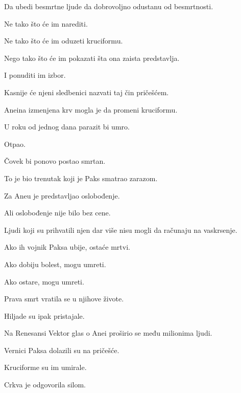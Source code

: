 Da ubedi besmrtne ljude da dobrovoljno odustanu od besmrtnosti.

\bigskip

Ne tako što će im narediti.

Ne tako što će im oduzeti kruciformu.

\bigskip

Nego tako što će im pokazati šta ona zaista predstavlja.

\bigskip

I ponuditi im izbor.

\bigskip

Kasnije će njeni sledbenici nazvati taj čin pričešćem.

\bigskip

Aneina izmenjena krv mogla je da promeni kruciformu.

U roku od jednog dana parazit bi umro.

Otpao.

\bigskip

Čovek bi ponovo postao smrtan.

\bigskip

To je bio trenutak koji je Paks smatrao zarazom.

\bigskip

Za Aneu je predstavljao oslobođenje.

\bigskip

Ali oslobođenje nije bilo bez cene.

\bigskip

Ljudi koji su prihvatili njen dar više nisu mogli da računaju na vaskrsenje.

Ako ih vojnik Paksa ubije, ostaće mrtvi.

\bigskip

Ako dobiju bolest, mogu umreti.

Ako ostare, mogu umreti.

\bigskip

Prava smrt vratila se u njihove živote.

\bigskip

Hiljade su ipak pristajale.

\bigskip

Na Renesansi Vektor glas o Anei proširio se među milionima ljudi.

Vernici Paksa dolazili su na pričešće.

Kruciforme su im umirale.

\bigskip

Crkva je odgovorila silom.

